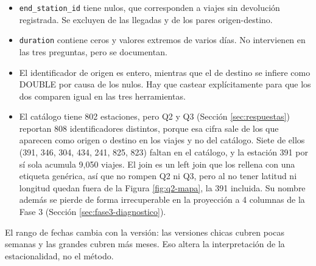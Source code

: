 \begin{itemize}
  \item \texttt{end\_station\_id} tiene nulos, que corresponden a viajes sin devolución registrada. Se excluyen de las llegadas y de los pares origen-destino.
  \item \texttt{duration} contiene ceros y valores extremos de varios días. No intervienen en las tres preguntas, pero se documentan.
  \item El identificador de origen es entero, mientras que el de destino se infiere como DOUBLE por causa de los nulos. Hay que castear explícitamente para que los dos comparen igual en las tres herramientas.
  \item El catálogo tiene 802 estaciones, pero Q2 y Q3 (Sección \ref{sec:respuestas}) reportan 808 identificadores distintos, porque esa cifra sale de los que aparecen como origen o destino en los viajes y no del catálogo. Siete de ellos (391, 346, 304, 434, 241, 825, 823) faltan en el catálogo, y la estación 391 por sí sola acumula 9,050 viajes. El join es un left join que los rellena con una etiqueta genérica, así que no rompen Q2 ni Q3, pero al no tener latitud ni longitud quedan fuera de la Figura \ref{fig:q2-mapa}, la 391 incluida. Su nombre además se pierde de forma irrecuperable en la proyección a 4 columnas de la Fase 3 (Sección \ref{sec:fase3-diagnostico}).
\end{itemize}

El rango de fechas cambia con la versión: las versiones chicas cubren pocas semanas y las grandes cubren más meses. Eso altera la interpretación de la estacionalidad, no el método.
